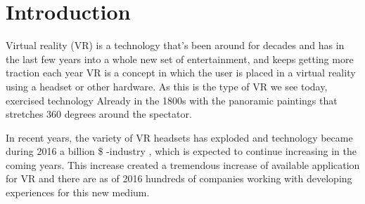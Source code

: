 
\chapter*{Introduction}
Virtual reality (VR) is a technology that's been around for decades and has in the last few years into a whole new set of entertainment, and keeps getting more traction each year
\cite{VR:mazuryk1996virtual}
VR is a concept in which the user is placed in a virtual reality using a headset or other hardware. As this is the type of VR we see today, exercised technology Already in the 1800s with the panoramic paintings that stretches 360 degrees around the spectator.

In recent years, the variety of VR headsets has exploded and technology became during 2016 a billion \$ -industry , which is expected to continue increasing in the coming years.
\cite{VR_stats:statista}
This increase created a tremendous increase of available application for VR and there are as of 2016 hundreds of companies working with developing experiences for this new medium.


